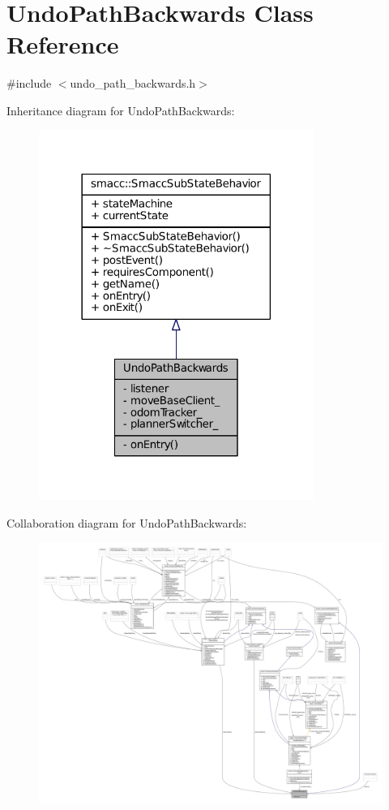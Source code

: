 \hypertarget{classUndoPathBackwards}{}\section{Undo\+Path\+Backwards Class Reference}
\label{classUndoPathBackwards}


{\ttfamily \#include $<$undo\+\_\+path\+\_\+backwards.\+h$>$}



Inheritance diagram for Undo\+Path\+Backwards\+:
\nopagebreak
\begin{figure}[H]
\begin{center}
\leavevmode
\includegraphics[width=254pt]{classUndoPathBackwards__inherit__graph}
\end{center}
\end{figure}


Collaboration diagram for Undo\+Path\+Backwards\+:
\nopagebreak
\begin{figure}[H]
\begin{center}
\leavevmode
\includegraphics[width=350pt]{classUndoPathBackwards__coll__graph}
\end{center}
\end{figure}
